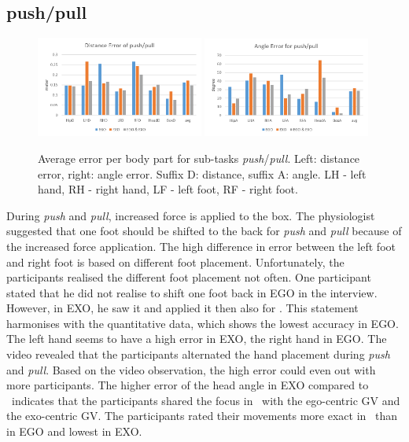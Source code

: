 \subsection{push/pull}
\begin{figure}[H]
	\centering
	\includegraphics[width=0.49\textwidth]{figures/distanceErrorPushPull.png}
	\includegraphics[width=0.49\textwidth]{figures/angleErrorPushPull.png}
	\caption[Average error per body part for sub-tasks \textit{push}/\textit{pull}.]{Average error per body part for sub-tasks \textit{push}/\textit{pull}. Left: distance error, right: angle error. Suffix D: distance, suffix A: angle. LH - left hand, RH - right hand, LF - left foot, RF - right foot.}
	\label{fig:errorPushPull}
\end{figure}
During \textit{push} and \textit{pull}, increased force is applied to the box. The physiologist suggested that one foot should be shifted to the back for \textit{push} and \textit{pull} because of the increased force application. The high difference in error between the left foot and right foot is based on different foot placement. Unfortunately, the participants realised the different foot placement not often. One participant stated that he did not realise to shift one foot back in EGO in the interview. However, in EXO, he saw it and applied it then also for \combi. This statement harmonises with the quantitative data, which shows the lowest accuracy in EGO. The left hand seems to have a high error in EXO, the right hand in EGO. The video revealed that the participants alternated the hand placement during \textit{push} and \textit{pull}. Based on the video observation, the high error could even out with more participants. The higher error of the head angle in EXO compared to \combi\ indicates that the participants shared the focus in \combi\ with the ego-centric GV and the exo-centric GV. The participants rated their movements more exact in \combi\ than in EGO and lowest in EXO.

